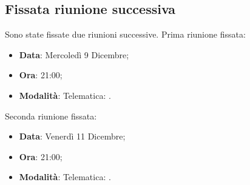 \documentclass[]{article}
\begin{document}
		\subsection{Fissata riunione successiva}
		Sono state fissate due riunioni successive.
		Prima riunione fissata:
		\begin{itemize}
			\item \textbf{Data}: Mercoledì 9 Dicembre;
			\item \textbf{Ora}: 21:00;
			\item \textbf{Modalità}: Telematica: .
		\end{itemize}
		Seconda riunione fissata:
		\begin{itemize}
			\item \textbf{Data}: Venerdì 11 Dicembre;
			\item \textbf{Ora}: 21:00;
			\item \textbf{Modalità}: Telematica: .
		\end{itemize}
\end{document}
